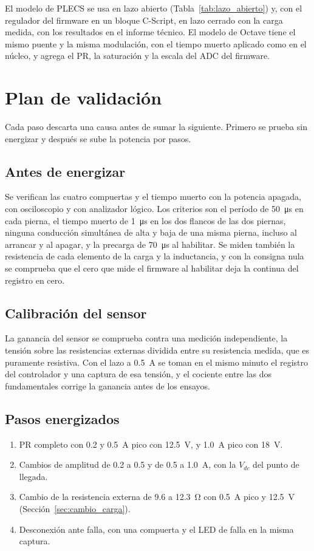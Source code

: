 \documentclass[journal]{IEEEtran}
\begin{document}
El modelo de PLECS se usa en lazo abierto (Tabla~\ref{tab:lazo_abierto}) y, con el regulador del firmware en un bloque C-Script, en lazo cerrado con la carga medida, con los resultados en el informe técnico. El modelo de Octave tiene el mismo puente y la misma modulación, con el tiempo muerto aplicado como en el núcleo, y agrega el PR, la saturación y la escala del ADC del firmware.

\section{Plan de validación}
\label{sec:plan}
Cada paso descarta una causa antes de sumar la siguiente. Primero se prueba sin energizar y después se sube la potencia por pasos.

\subsection{Antes de energizar}
Se verifican las cuatro compuertas y el tiempo muerto con la potencia apagada, con osciloscopio y con analizador lógico. Los criterios son el período de \SI{50}{\micro s} en cada pierna, el tiempo muerto de \SI{1}{\micro s} en los dos flancos de las dos piernas, ninguna conducción simultánea de alta y baja de una misma pierna, incluso al arrancar y al apagar, y la precarga de \SI{70}{\micro s} al habilitar. Se miden también la resistencia de cada elemento de la carga y la inductancia, y con la consigna nula se comprueba que el cero que mide el firmware al habilitar deja la continua del registro en cero.

\subsection{Calibración del sensor}
La ganancia del sensor se comprueba contra una medición independiente, la tensión sobre las resistencias externas dividida entre su resistencia medida, que es puramente resistiva. Con el lazo a \SI{0.5}{A} se toman en el mismo minuto el registro del controlador y una captura de esa tensión, y el cociente entre las dos fundamentales corrige la ganancia antes de los ensayos.

\subsection{Pasos energizados}
\begin{enumerate}
	\item PR completo con \num{0.2} y \SI{0.5}{A} pico con \SI{12.5}{V}, y \SI{1.0}{A} pico con \SI{18}{V}.
	\item Cambios de amplitud de \num{0.2} a \num{0.5} y de \num{0.5} a \SI{1.0}{A}, con la $V_{dc}$ del punto de llegada.
	\item Cambio de la resistencia externa de \SI{9.6}{} a \SI{12.3}{\ohm} con \SI{0.5}{A} pico y \SI{12.5}{V} (Sección~\ref{sec:cambio_carga}).
	\item Desconexión ante falla, con una compuerta y el LED de falla en la misma captura.
\end{enumerate}
\end{document}
